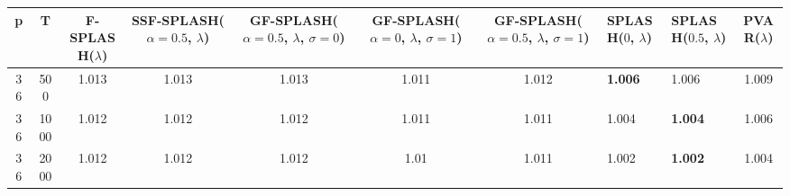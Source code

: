 \begin{tabular}{cccccccllc}
\hline
  p  &  T   &  F-SPLASH($\lambda$)  &  SSF-SPLASH($\alpha=0.5$, $\lambda$)  &  GF-SPLASH($\alpha=0.5$, $\lambda$, $\sigma=0$)  &  GF-SPLASH($\alpha=0$, $\lambda$, $\sigma=1$)  &  GF-SPLASH($\alpha=0.5$, $\lambda$, $\sigma=1$)  & SPLASH($0$, $\lambda$)   & SPLASH($0.5$, $\lambda$)   &  PVAR($\lambda$)  \\
\hline
 36  & 500  &         1.013         &                 1.013                 &                      1.013                       &                     1.011                      &                      1.012                       & \textbf{1.006}           & 1.006                      &       1.009       \\
 36  & 1000 &         1.012         &                 1.012                 &                      1.012                       &                     1.011                      &                      1.011                       & 1.004                    & \textbf{1.004}             &       1.006       \\
 36  & 2000 &         1.012         &                 1.012                 &                      1.012                       &                      1.01                      &                      1.011                       & 1.002                    & \textbf{1.002}             &       1.004       \\
\hline
\end{tabular}